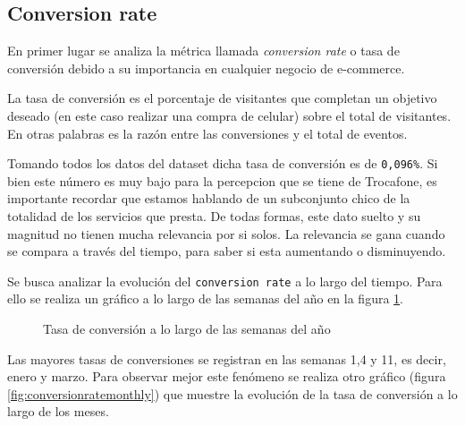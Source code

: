 \documentclass[a4paper]{article}
\begin{document}
\subsection{Conversion rate}

En primer lugar se analiza la métrica llamada \textit{conversion rate} o tasa de conversión debido a su importancia en cualquier negocio de e-commerce.

La tasa de conversión es el porcentaje de visitantes que completan un objetivo deseado (en este caso realizar una compra de celular) sobre el total de visitantes. En otras palabras es la razón entre las conversiones y el total de eventos.

Tomando todos los datos del dataset dicha tasa de conversión es de \texttt{0,096\%}. Si bien este número es muy bajo para la percepcion que se tiene de Trocafone, es importante recordar que estamos hablando de un subconjunto chico de la totalidad de los servicios que presta. De todas formas, este dato suelto y su magnitud no tienen mucha relevancia por si solos. La relevancia se gana cuando se compara a través del tiempo, para saber si esta aumentando o disminuyendo.

Se busca analizar la evolución del \texttt{conversion rate} a lo largo del tiempo. Para ello se realiza un gráfico a lo largo de las semanas del año en la figura \ref{fig:conversionrate}.

\begin{figure}[h!]
	\caption{Tasa de conversión a lo largo de las semanas del año}
	\label{fig:conversionrate}
\end{figure}

Las mayores tasas de conversiones se registran en las semanas 1,4 y 11, es decir, enero y marzo. Para observar mejor este fenómeno se realiza otro gráfico (figura \ref{fig:conversionratemonthly}) que muestre la evolución de la tasa de conversión a lo largo de los meses. 
\end{document}
